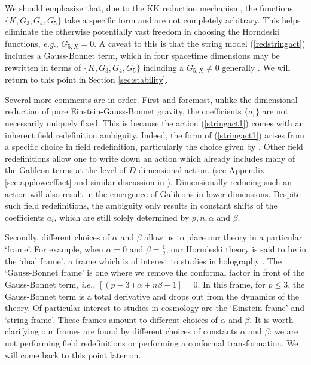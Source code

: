\documentclass[amsmath,amssymb,11pt]{article}
\begin{document}
We should emphasize that, due to the KK reduction mechanism, the functions $\{K,G_{3},G_{4},G_{5}\}$ take a specific form and are not completely arbitrary. This helps eliminate the otherwise potentially vast freedom in choosing the Horndeski functions, \emph{e.g.}, $G_{5,X}=0$. A caveat to this is that the string model (\ref{redstringact}) includes a Gauss-Bonnet term, which in four spacetime dimensions may be rewritten in terms of $\{K,G_{3},G_{4},G_{5}\}$ including a $G_{5,X}\neq0$ generally \cite{Kobayashi:2011nu,DeFelice:2011uc}. We will return to this point in Section \ref{sec:stability}. 



Several more comments are in order. First and foremost, unlike the dimensional reduction of pure Einstein-Gauss-Bonnet gravity, the coefficients $\{a_{i}\}$ are not necessarily uniquely fixed. This is because the action (\ref{stringact1}) comes with an inherent field redefinition ambiguity. Indeed, the form of (\ref{stringact1}) arises from a specific choice in field redefinition, particularly the choice given by \cite{Metsaev:1987zx,Gasperini07-1}. Other field redefinitions allow one to write down an action which already includes many of the Galileon terms at the level of $D$-dimensional action. (see Appendix \ref{sec:apploweeffact} and similar discussion in \cite{Maeda:2011zn}). Dimensionally reducing such an action will also result in the emergence of Galileons in lower dimensions. Despite such field redefinitions, the ambiguity only results in constant shifts of the coefficients $a_{i}$, which are still  solely determined by $p,n,\alpha$ and $\beta$. 



Secondly, different choices of $\alpha$ and $\beta$ allow us to place our theory in a particular `frame'. For example, when $\alpha=0$ and $\beta=\frac{1}{2}$, our Horndeski theory is said to be in the `dual frame', a frame which is of interest to studies in holography \cite{Kanitscheider:2009as,Gouteraux:2011qh}. The `Gauss-Bonnet frame' is one where we remove the conformal factor in front of the Gauss-Bonnet term, \emph{i.e.,} $[(p-3)\alpha+n\beta-1]=0$. In this frame, for $p\leq3$, the Gauss-Bonnet term is a total derivative and drops out from the dynamics of the theory.  Of particular interest to studies in cosmology are the `Einstein frame' and `string frame'. These frames amount to different choices of $\alpha$ and $\beta$. It is worth clarifying our frames are found by different choices of constants $\alpha$ and $\beta$: we are not performing field redefinitions or performing a conformal transformation. We will come back to this point later on. 
 
\end{document}
